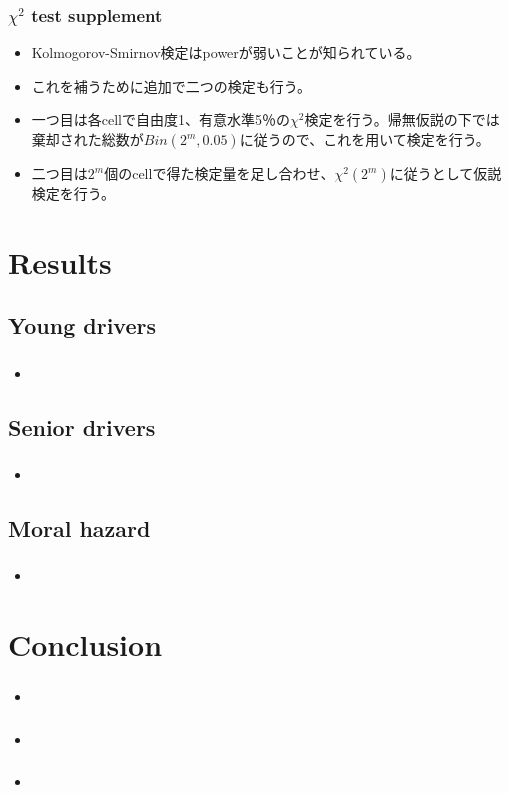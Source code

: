 \documentclass[dvipdfmx, 12pt]{beamer}
\begin{document}
\begin{frame}\frametitle{$\chi^2$ test supplement}
	\begin{itemize}
	\item Kolmogorov-Smirnov検定はpowerが弱いことが知られている。
	\item これを補うために追加で二つの検定も行う。
	\item 一つ目は各cellで自由度1、有意水準5％の$\chi^2$検定を行う。帰無仮説の下では棄却された総数が$Bin(2^m, 0.05)$に従うので、これを用いて検定を行う。
	\item 二つ目は$2^m$個のcellで得た検定量を足し合わせ、$\chi^2(2^m)$に従うとして仮説検定を行う。
	\end{itemize}
\end{frame}


\section{Results}
\subsection{Young drivers}
\begin{frame}\frametitle{}
	\begin{itemize}
	\item 
	\end{itemize}
\end{frame}

\subsection{Senior drivers}
\begin{frame}\frametitle{}
	\begin{itemize}
	\item 
	\end{itemize}
\end{frame}

\subsection{Moral hazard}
\begin{frame}\frametitle{}
	\begin{itemize}
	\item 
	\end{itemize}
\end{frame}


\section{Conclusion}
\begin{frame}\frametitle{}
	\begin{itemize}
	\item 
	\end{itemize}
\end{frame}

\begin{frame}\frametitle{}
	\begin{itemize}
	\item 
	\end{itemize}
\end{frame}

\begin{frame}\frametitle{}
	\begin{itemize}
	\item 
	\end{itemize}
\end{frame}
\end{document}
